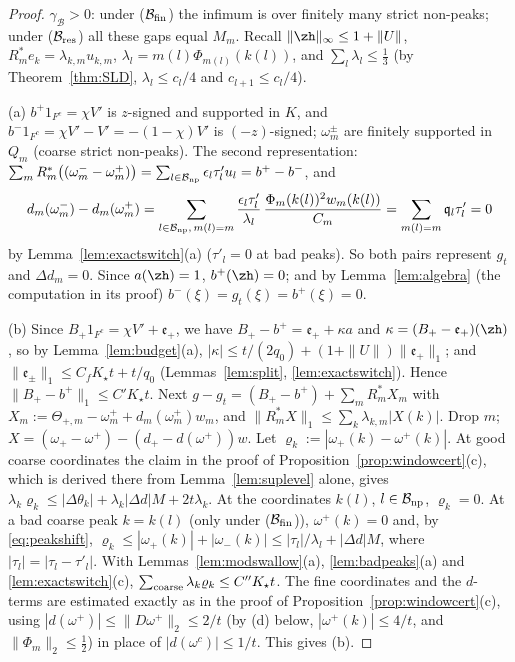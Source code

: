 \begin{proof}
$\gamma_{\mathcal B}>0$: under ($\mathcal B_{\rm fin}$) the infimum is over
finitely many strict non-peaks; under ($\mathcal B_{\rm res}$) all these gaps
equal $M_m$.  Recall $\|\zh\|_\infty\le1+\|U\|$, $R_m^*e_k=\lambda_{k,m}u_{k,m}$,
$\lambda_l=m(l)\Phi_{m(l)}(k(l))$, and $\sum_l\lambda_l\le\frac13$ (by
Theorem~\ref{thm:SLD}, $\lambda_l\le c_l/4$ and $c_{l+1}\le c_l/4$).

(a) $b^+1_{F^c}=\chi V'$ is $z$-signed and supported in $K$, and
$b^-1_{F^c}=\chi V'-V'=-(1-\chi)V'$ is $(-z)$-signed; $\omega^\pm_m$ are
finitely supported in $Q_m$ (coarse strict non-peaks).  The second
representation: $\sum_mR_m^*\big((\omega^-_m-\omega^+_m)\big)=\sum_{l\in
\mathcal B_{\rm np}}\epsilon_l\tau'_lu_l=b^+-b^-$, and
\[
 d_m(\omega^-_m)-d_m(\omega^+_m)=\sum_{l\in\mathcal B_{\rm np},\,m(l)=m}
 \frac{\epsilon_l\tau'_l}{\lambda_l}\,\frac{\Phi_m(k(l))^2w_m(k(l))}{C_m}=
 \sum_{m(l)=m}\mathfrak q_l\tau'_l=0
\]
by Lemma~\ref{lem:exactswitch}(a) ($\tau'_l=0$ at bad peaks).  So both pairs
represent $g_t$ and $\Delta d_m=0$.  Since $a(\zh)=1$, $b^+(\zh)=0$; and by
Lemma~\ref{lem:algebra} (the computation in its proof)
$b^-(\xi)=g_t(\xi)=b^+(\xi)=0$.

(b) Since $B_+1_{F^c}=\chi V'+\mathfrak e_+$, we have $B_+-b^+=\mathfrak
e_++\kappa a$ and $\kappa=(B_+-\mathfrak e_+)(\zh)$, so by
Lemma~\ref{lem:budget}(a), $|\kappa|\le t/(2q_0)+(1+\|U\|)\|\mathfrak
e_+\|_1$; and $\|\mathfrak e_\pm\|_1\le C_fK_\star t+t/q_0$
(Lemmas~\ref{lem:split}, \ref{lem:exactswitch}).  Hence $\|B_+-b^+\|_1\le
C'K_\star t$.  Next $g-g_t=(B_+-b^+)+\sum_mR_m^*X_m$ with $X_m:=\Theta_{+,m}-
\omega^+_m+d_m(\omega^+_m)w_m$, and $\|R_m^*X\|_1\le\sum_k\lambda_{k,m}|X(k)|$.
Drop $m$; $X=(\omega_+-\omega^+)-(d_+-d(\omega^+))w$.  Let
$\varrho_k:=|\omega_+(k)-\omega^+(k)|$.  At good coarse coordinates the
claim in the proof of Proposition~\ref{prop:windowcert}(c), which is
derived there from Lemma~\ref{lem:suplevel} alone, gives
$\lambda_k\varrho_k\le|\Delta\theta_k|+\lambda_k|\Delta d|M+2t\lambda_k$.  At
the coordinates $k(l)$, $l\in\mathcal B_{\rm np}$, $\varrho_k=0$.  At a bad
coarse peak $k=k(l)$ (only under ($\mathcal B_{\rm fin}$)), $\omega^+(k)=0$
and, by \eqref{eq:peakshift}, $\varrho_k\le|\omega_+(k)|+|\omega_-(k)|\le
|\tau_l|/\lambda_l+|\Delta d|M$, where $|\tau_l|=|\tau_l-\tau'_l|$.  With
Lemmas~\ref{lem:modswallow}(a), \ref{lem:badpeaks}(a) and
\ref{lem:exactswitch}(c), $\sum_{\rm coarse}\lambda_k\varrho_k\le C''K_\star
t$.  The fine coordinates and the $d$-terms are estimated exactly as in the
proof of Proposition~\ref{prop:windowcert}(c), using
$|d(\omega^+)|\le\|D\omega^+\|_2\le2/t$ (by (d) below, $|\omega^+(k)|\le4/t$,
and $\|\Phi_m\|_2\le\frac12$) in place of $|d(\omega^c)|\le1/t$.  This
gives (b).


\end{proof}
